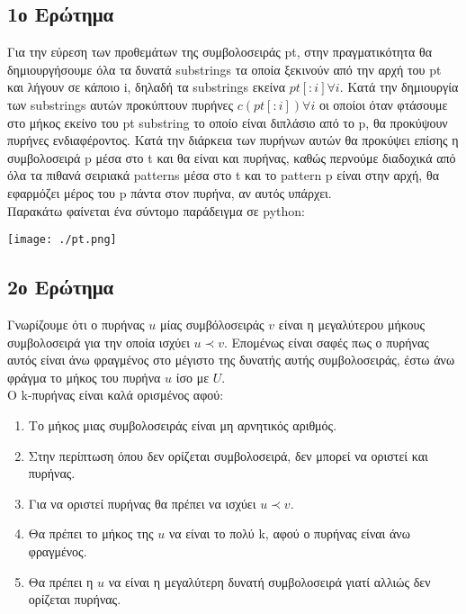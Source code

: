 \documentclass{article}
\begin{document}
\subsection{1ο Ερώτημα}
Για την εύρεση των προθεμάτων της συμβολοσειράς pt, στην πραγματικότητα θα δημιουργήσουμε όλα τα δυνατά
substrings τα οποία ξεκινούν από την αρχή του pt και λήγουν σε κάποιο i, δηλαδή τα  substrings εκείνα
$pt[:i] \forall i$. Κατά την δημιουργία των substrings αυτών προκύπτουν πυρήνες $c(pt[:i]) \forall i$
οι οποίοι όταν φτάσουμε στο μήκος εκείνο του pt substring το οποίο είναι διπλάσιο από το p, θα προκύψουν
πυρήνες ενδιαφέροντος. Κατά την διάρκεια των πυρήνων αυτών θα προκύψει επίσης η συμβολοσειρά p μέσα στο 
t και θα είναι και πυρήνας, καθώς περνούμε διαδοχικά από όλα τα πιθανά σειριακά patterns μέσα στο t και το pattern
p είναι στην αρχή, θα εφαρμόζει μέρος του p πάντα στον πυρήνα, αν αυτός υπάρχει.\\

Παρακάτω φαίνεται ένα σύντομο παράδειγμα σε python:\\
\begin{center}
    \texttt{[image: ./pt.png]}
\end{center}
\pagebreak

\subsection{2ο Ερώτημα}
Γνωρίζουμε ότι ο πυρήνας $u$ μίας συμβόλοσειράς $v$ είναι η μεγαλύτερου μήκους συμβολοσειρά για την 
οποία ισχύει $u \prec v$. Επομένως είναι σαφές πως ο πυρήνας αυτός είναι άνω φραγμένος στο μέγιστο της
δυνατής αυτής συμβολοσειράς, έστω άνω φράγμα το μήκος του πυρήνα $u$ ίσο με $U$.\\

Ο k-πυρήνας είναι καλά ορισμένος αφού:\\
\begin{enumerate}
    \item{Το μήκος μιας συμβολοσειράς είναι μη αρνητικός αριθμός.}
    \item{Στην περίπτωση όπου δεν ορίζεται συμβολοσειρά, δεν μπορεί να οριστεί και πυρήνας.}
    \item{Για να οριστεί πυρήνας θα πρέπει να ισχύει $u \prec v$.}
    \item{Θα πρέπει το μήκος της $u$ να είναι το πολύ k, αφού ο πυρήνας είναι άνω φραγμένος.}
    \item{Θα πρέπει η $u$ να είναι η μεγαλύτερη δυνατή συμβολοσειρά γιατί αλλιώς δεν ορίζεται πυρήνας.}
\end{enumerate}
\end{document}
